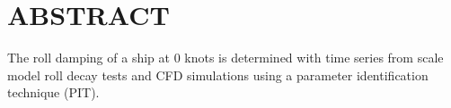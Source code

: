\section*{ABSTRACT}\label{abstract}
The roll damping of a ship at 0 knots is determined with time series
from scale model roll decay tests and CFD simulations using a parameter
identification technique (PIT).

